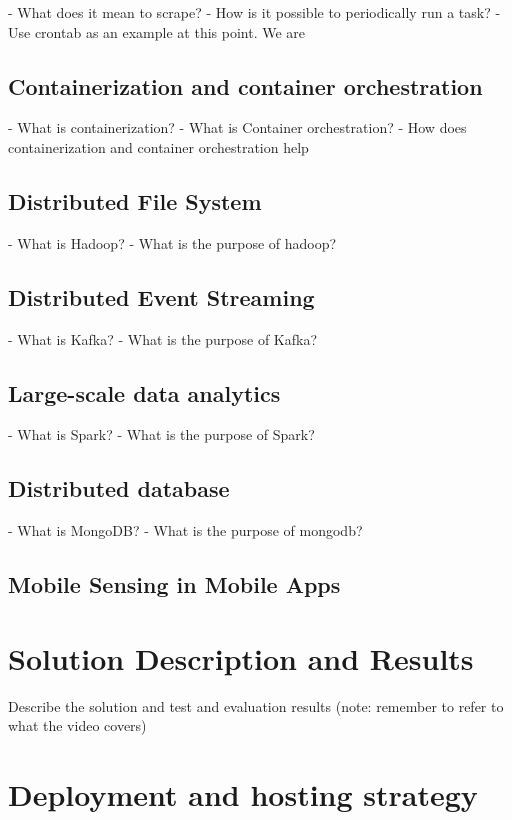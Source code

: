 - What does it mean to scrape?
- How is it possible to periodically run a task?
- Use crontab as an example at this point. We are

\subsection{Containerization and container orchestration}

- What is containerization?
- What is Container orchestration?
- How does containerization and container orchestration help

\subsection{Distributed File System}

- What is Hadoop?
- What is the purpose of hadoop?

\subsection{Distributed Event Streaming}

- What is Kafka?
- What is the purpose of Kafka?

\subsection{Large-scale data analytics}

- What is Spark?
- What is the purpose of Spark?

\subsection{Distributed database}

- What is MongoDB?
- What is the purpose of mongodb?

\subsection{Mobile Sensing in Mobile Apps}

\section{Solution Description and Results}
Describe the solution and test and evaluation results (note: remember to refer to what the video covers)

\section{Deployment and hosting strategy}

